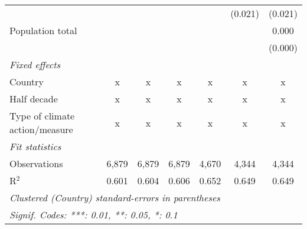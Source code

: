 \begin{tabular}{lcccccc}
                                                                                      &                &                &                &                & (0.021)        & (0.021)\\   
   Population total                                                                   &                &                &                &                &                & 0.000\\   
                                                                                      &                &                &                &                &                & (0.000)\\   
   \emph{Fixed effects}\\
   Country                                                                            & x              & x              & x              & x              & x              & x\\  
   Half decade                                                                        & x              & x              & x              & x              & x              & x\\  
   Type of climate action/measure                                                     & x              & x              & x              & x              & x              & x\\  
   \midrule \emph{Fit statistics}\\
   Observations                                                                       & 6,879          & 6,879          & 6,879          & 4,670          & 4,344          & 4,344\\  
   R$^2$                                                                              & 0.601          & 0.604          & 0.606          & 0.652          & 0.649          & 0.649\\  
   \midrule
   \multicolumn{7}{l}{\emph{Clustered (Country) standard-errors in parentheses}}\\
   \multicolumn{7}{l}{\emph{Signif. Codes: ***: 0.01, **: 0.05, *: 0.1}}\\
\end{tabular}
\par\endgroup


